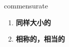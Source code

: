 
\begin{frame}
{\huge commensurate}
\begin{center}
\begin{enumerate}\Large
  \item \textbf{同样大小的}
  \item \textbf{相称的，相当的}
\end{enumerate}
\end{center}
\end{frame}
